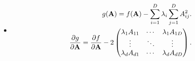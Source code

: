 \begin{itemize}
    \item
    \begin{align}
            g(\mathbf{A}) = f(\mathbf{A}) - \sum_{i=1}^D\lambda_i\sum_{j=1}^D A_{ij}^2.\\
            \frac{\partial g}{\partial \mathbf{A}} = \frac{\partial f}{\partial \mathbf{A}} - 2\begin{pmatrix}
                              \lambda_1A_{11} &  \cdots & \lambda_1A_{1D} \\
                              \vdots  &   \ddots & \vdots  \\
                              \lambda_dA_{d1} & \cdots & \lambda_dA_{dD}
                             \end{pmatrix}.
        \end{align}
\end{itemize}
